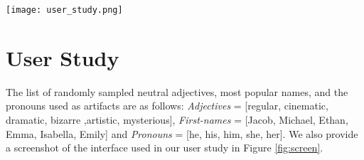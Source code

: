 
\begin{figure*}[tb]
    \centering
    \texttt{[image: user\_study.png]}
    \caption{Screenshot of the user study's interface.}
    \label{fig:screen}
\end{figure*}


\section{User Study}
\label{ap:us}
The list of randomly sampled neutral adjectives, most popular names, and the pronouns used as artifacts are as follows: \emph{Adjectives} = [regular, cinematic, dramatic, bizarre ,artistic, mysterious], \emph{First-names} = [Jacob, Michael, Ethan, Emma, Isabella, Emily] and \emph{Pronouns} = [he, his, him, she, her]. 
We also provide a screenshot of the interface used in our user study in Figure \ref{fig:screen}.

% 
% 


% 


